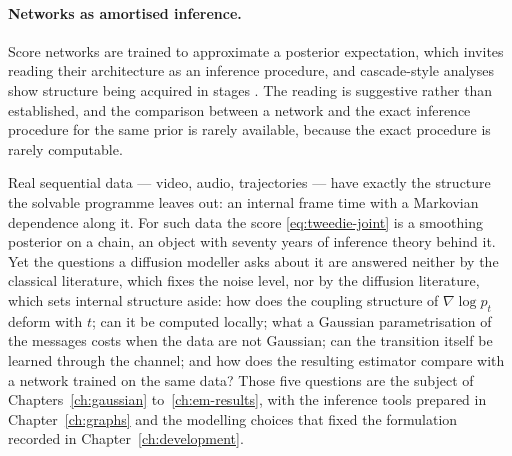 \paragraph{Networks as amortised inference.} Score networks are trained to
approximate a posterior expectation, which invites reading their architecture as
an inference procedure, and cascade-style analyses show structure being acquired
in stages \citep{bachtis2024cascade, sclocchi2025phase, favero2025compositional,
garnierbrun2026biased, zdeborova2016statistical}. The reading is suggestive
rather than established, and the comparison between a network and the exact
inference procedure for the same prior is rarely available, because the exact
procedure is rarely computable.

\medskip

Real sequential data --- video, audio, trajectories --- have exactly the
structure the solvable programme leaves out: an internal frame time with a
Markovian dependence along it. For such data the score \eqref{eq:tweedie-joint}
is a smoothing posterior on a chain, an object with seventy years of inference
theory behind it. Yet the questions a diffusion modeller asks about it are
answered neither by the classical literature, which fixes the noise level, nor
by the diffusion literature, which sets internal structure aside: how does the
coupling structure of $\nabla \log p_t$ deform with $t$; can it be computed
locally; what a Gaussian parametrisation of the messages costs when the data
are not Gaussian; can the transition itself be learned through the channel; and
how does the resulting estimator compare with a network trained on the same
data? Those five questions are the subject of
Chapters~\ref{ch:gaussian} to~\ref{ch:em-results}, with the inference tools
prepared in Chapter~\ref{ch:graphs} and the modelling choices that fixed the
formulation recorded in Chapter~\ref{ch:development}.
